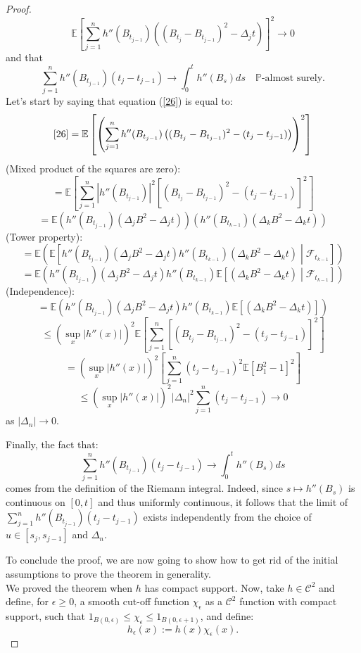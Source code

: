 \begin{ProofBox}
\begin{proof}
\begin{equation}
\label{26}
    \mathbb{E} \left[ \sum_{j=1}^{n} h''(B_{t_{j-1}}) \left( (B_{t_j} - B_{t_{j-1}})^2 - \Delta_j t \right) \right]^2 \to 0
\end{equation}
and that
\[
\sum_{j=1}^{n} h''(B_{t_{j-1}}) (t_j - t_{j-1}) \to \int_0^t h''(B_s) ds \quad \mathbb{P}\text{-almost surely}.
\]
Let’s start by saying that equation (\ref{26}) is equal to:
\[
\ref{26} = \mathbb{E} \left[ \left( \sum_{j=1}^{n} h''(B_{t_{j-1}}) \left( (B_{t_j} - B_{t_{j-1}})^2 - (t_j - t_{j-1}) \right) \right)^2 \right]
\]
(Mixed product of the squares are zero):
\[
= \mathbb{E} \left[ \sum_{j=1}^{n} |h''(B_{t_{j-1}})|^2 \left[ (B_{t_j} - B_{t_{j-1}})^2 - (t_j - t_{j-1}) \right]^2 \right]
\]
\[
= \mathbb{E} \left( h''(B_{t_{j-1}}) (\Delta_j B^2 - \Delta_j t) \right) \left( h''(B_{t_{k-1}}) (\Delta_k B^2 - \Delta_k t) \right)
\]
(Tower property):
\[
= \mathbb{E}\left(\mathbb{E} \left[ h''(B_{t_{j-1}}) (\Delta_j B^2 - \Delta_j t) h''(B_{t_{k-1}}) (\Delta_k B^2 - \Delta_k t) \middle| \mathcal{F}_{t_{k-1}} \right] \right)
\]
\[
= \mathbb{E} \left( h''(B_{t_{j-1}}) (\Delta_j B^2 - \Delta_j t) h''(B_{t_{k-1}}) \mathbb{E} \left[ (\Delta_k B^2 - \Delta_k t) \middle| \mathcal{F}_{t_{k-1}} \right] \right)
\]
(Independence):
\[
= \mathbb{E} \left( h''(B_{t_{j-1}}) (\Delta_j B^2 - \Delta_j t) h''(B_{t_{k-1}}) \mathbb{E} \left[ (\Delta_k B^2 - \Delta_k t) \right] \right)
\]
\[
\leq \left( \sup_x |h''(x)| \right)^2 \mathbb{E} \left[ \sum_{j=1}^{n} \left[ (B_{t_j} - B_{t_{j-1}})^2 - (t_j - t_{j-1}) \right]^2 \right]
\]
\[
= \left( \sup_x |h''(x)| \right)^2  \left[ \sum_{j=1}^{n} \left( t_j - t_{j-1} \right)^2 \mathbb{E} \left[ B_1^2 - 1 \right]^2 \right]
\]
\[
\leq \left( \sup_x |h''(x)| \right)^2 | \Delta_n |^2 \sum_{j=1}^{n} \left( t_j - t_{j-1} \right) \to 0
\]
as \( | \Delta_n | \to 0 \).

Finally, the fact that:
\[
\sum_{j=1}^{n} h''(B_{t_{j-1}}) (t_j - t_{j-1}) \to \int_0^t h''(B_s) ds
\]
comes from the definition of the Riemann integral. Indeed, since \( s \mapsto h''(B_s) \) is continuous on \( [0,t] \) and thus uniformly continuous, it follows that the limit of \( \sum_{j=1}^{n} h''(B_{t_{j-1}}) (t_j - t_{j-1}) \) exists independently from the choice of \( u \in [s_j, s_{j-1}] \) and \( \Delta_n \).

To conclude the proof, we are now going to show how to get rid of the initial assumptions to prove the theorem in generality. \\

We proved the theorem when $h$ has compact support. Now, take $h \in \mathcal{C}^2$ and define, for $\epsilon \geq 0$, a smooth cut-off function $\chi_\epsilon$ as a $\mathcal{C}^2$ function with compact support, such that $1_{B(0,\epsilon)} \leq \chi_\epsilon \leq 1_{B(0,\epsilon+1)}$, and define:
\[
h_\epsilon(x) := h(x) \chi_\epsilon(x).
\]


\end{proof}
\end{ProofBox}
